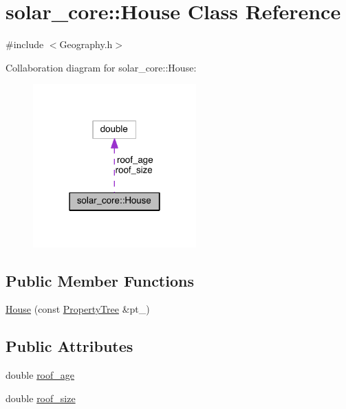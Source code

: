 \hypertarget{classsolar__core_1_1_house}{}\section{solar\+\_\+core\+:\+:House Class Reference}
\label{classsolar__core_1_1_house}


{\ttfamily \#include $<$Geography.\+h$>$}



Collaboration diagram for solar\+\_\+core\+:\+:House\+:\nopagebreak
\begin{figure}[H]
\begin{center}
\leavevmode
\includegraphics[width=178pt]{classsolar__core_1_1_house__coll__graph}
\end{center}
\end{figure}
\subsection*{Public Member Functions}
\begin{DoxyCompactItemize}
\item 
\hyperlink{classsolar__core_1_1_house_a1babbd79506a4acf93c16ceec093b924}{House} (const \hyperlink{namespacesolar__core_adeda2737d6938c190eb774a5b2495045}{Property\+Tree} \&pt\+\_\+)
\end{DoxyCompactItemize}
\subsection*{Public Attributes}
\begin{DoxyCompactItemize}
\item 
double \hyperlink{classsolar__core_1_1_house_aa6491ce4f3fc6d99a59ea80cfb8194fc}{roof\+\_\+age}
\item 
double \hyperlink{classsolar__core_1_1_house_a7f872cb768b83e70e263590078fa4c7d}{roof\+\_\+size}
\end{DoxyCompactItemize}


